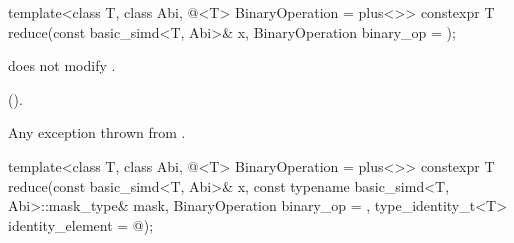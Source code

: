 
\begin{itemdecl}
template<class T, class Abi, @\reductionoperation@<T> BinaryOperation = plus<>>
  constexpr T reduce(const basic_simd<T, Abi>& x, BinaryOperation binary_op = {});
\end{itemdecl}

\begin{itemdescr}
  \pnum\expects
   does not modify .

  \pnum\returns
  ().

  \pnum\throws
  Any exception thrown from .
\end{itemdescr}

\begin{itemdecl}
template<class T, class Abi, @\reductionoperation@<T> BinaryOperation = plus<>>
  constexpr T reduce(const basic_simd<T, Abi>& x, const typename basic_simd<T, Abi>::mask_type& mask,
                     BinaryOperation binary_op = {}, type_identity_t<T> identity_element = @\seebelow@);
\end{itemdecl}

